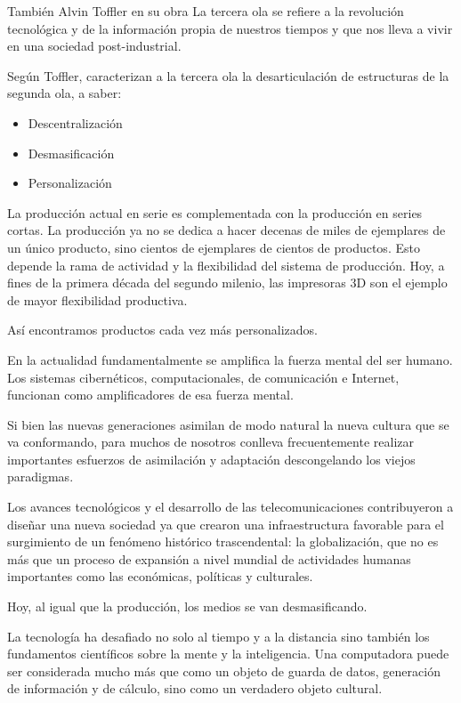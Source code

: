 \documentclass[a4paper, 12pt]{article}
\begin{document}
También Alvin Toffler\cite{Toffler1997} en su obra La tercera ola se refiere a la revolución tecnológica y de la información propia de nuestros tiempos y que nos lleva a vivir en una sociedad post-industrial.

Según Toffler, caracterizan a la tercera ola la desarticulación de estructuras de la segunda ola, a saber:
\begin{itemize}
\item Descentralización
\item Desmasificación
\item Personalización
\end{itemize}

La producción actual en serie es complementada con la producción en series cortas. La producción ya no se dedica a hacer decenas de miles de ejemplares de un único producto, sino cientos de ejemplares de cientos de productos. Esto depende la rama de actividad y la flexibilidad del sistema de producción. Hoy,  a fines de la primera década del segundo milenio, las impresoras 3D son el ejemplo de mayor flexibilidad productiva.

Así encontramos productos cada vez más personalizados.

En la actualidad fundamentalmente se amplifica la fuerza mental del ser humano. Los sistemas cibernéticos, computacionales, de comunicación e Internet, funcionan como amplificadores de esa fuerza mental.

Si bien las nuevas generaciones asimilan de modo natural la nueva cultura que se va conformando, para muchos de nosotros conlleva frecuentemente realizar importantes esfuerzos de asimilación y adaptación descongelando los viejos paradigmas.

Los avances tecnológicos y el desarrollo de las telecomunicaciones contribuyeron a diseñar una nueva sociedad ya que crearon una infraestructura favorable para el surgimiento de un fenómeno histórico trascendental:  la globalización, que no es más que un proceso de expansión a nivel mundial de actividades humanas importantes como las económicas, políticas y culturales.

Hoy, al igual que la producción, los medios se van desmasificando.

La tecnología ha desafiado no solo al tiempo y a la distancia sino también los fundamentos científicos sobre la mente y la inteligencia. Una computadora puede ser considerada mucho más que como un objeto de guarda de datos, generación de información y de cálculo, sino como un verdadero objeto cultural.
\end{document}
